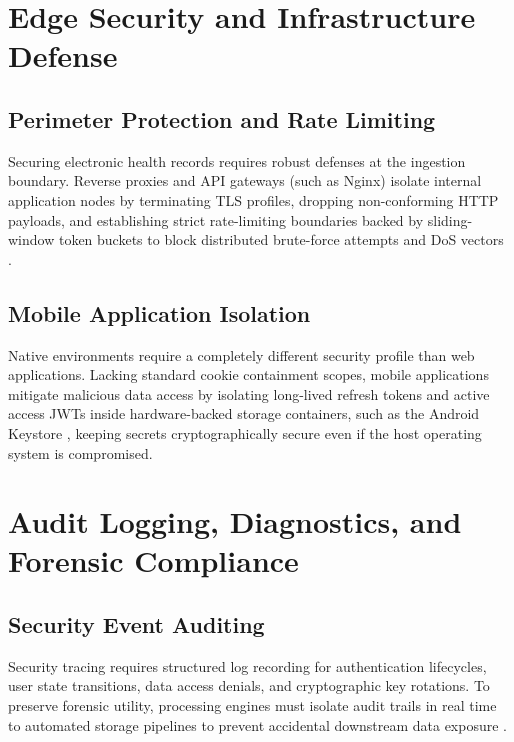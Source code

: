 \section{Edge Security and Infrastructure Defense}

\subsection{Perimeter Protection and Rate Limiting}
Securing electronic health records requires robust defenses at the ingestion boundary. 
Reverse proxies and API gateways (such as Nginx) isolate internal application nodes by terminating TLS profiles, dropping non-conforming HTTP payloads, and establishing strict rate-limiting boundaries backed by sliding-window token buckets to block distributed brute-force attempts and \ac{DoS} vectors \cite{ratelimit}.

\subsection{Mobile Application Isolation}
Native environments require a completely different security profile than web applications. 
Lacking standard cookie containment scopes, mobile applications mitigate malicious data access by isolating long-lived refresh tokens and active access JWTs inside hardware-backed storage containers, such as the Android Keystore \cite{android_keystore}, keeping secrets cryptographically secure even if the host operating system is compromised.

\section{Audit Logging, Diagnostics, and Forensic Compliance}

\subsection{Security Event Auditing}
Security tracing requires structured log recording for authentication lifecycles, user state transitions, data access denials, and cryptographic key rotations. 
To preserve forensic utility, processing engines must isolate audit trails in real time to automated storage pipelines to prevent accidental downstream data exposure \cite{owasp_logging}.



